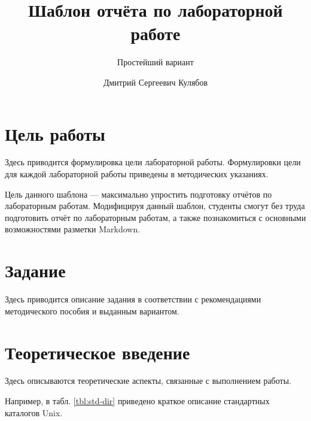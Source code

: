 \documentclass[
  12pt,
  russian,
  a4paper,
]{scrreprt}
\title{Шаблон отчёта по лабораторной работе}
\subtitle{Простейший вариант}
\author{Дмитрий Сергеевич Кулябов}
\date{}
\begin{document}
\maketitle

\renewcommand*\contentsname{Содержание}
{
\setcounter{tocdepth}{2}
\tableofcontents
}
\listoftables
\listoffigures
{}
\hypertarget{ux446ux435ux43bux44c-ux440ux430ux431ux43eux442ux44b}{%
\chapter{Цель
работы}\label{ux446ux435ux43bux44c-ux440ux430ux431ux43eux442ux44b}}

Здесь приводится формулировка цели лабораторной работы. Формулировки
цели для каждой лабораторной работы приведены в методических указаниях.

Цель данного шаблона — максимально упростить подготовку отчётов по
лабораторным работам. Модифицируя данный шаблон, студенты смогут без
труда подготовить отчёт по лабораторным работам, а также познакомиться с
основными возможностями разметки Markdown.

\hypertarget{ux437ux430ux434ux430ux43dux438ux435}{%
\chapter{Задание}\label{ux437ux430ux434ux430ux43dux438ux435}}

Здесь приводится описание задания в соответствии с рекомендациями
методического пособия и выданным вариантом.

\hypertarget{ux442ux435ux43eux440ux435ux442ux438ux447ux435ux441ux43aux43eux435-ux432ux432ux435ux434ux435ux43dux438ux435}{%
\chapter{Теоретическое
введение}\label{ux442ux435ux43eux440ux435ux442ux438ux447ux435ux441ux43aux43eux435-ux432ux432ux435ux434ux435ux43dux438ux435}}

Здесь описываются теоретические аспекты, связанные с выполнением работы.

Например, в табл. \ref{tbl:std-dir} приведено краткое описание
стандартных каталогов Unix.
\end{document}

